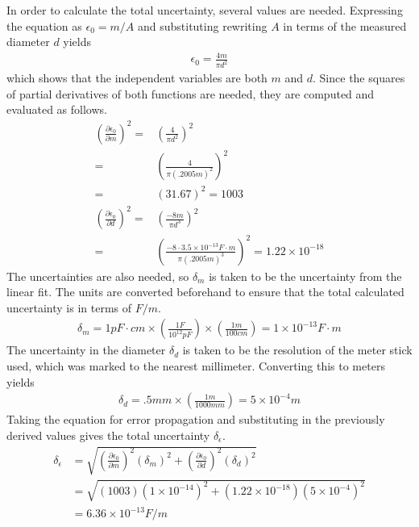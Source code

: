 \documentclass[twocolumn,english]{IEEEtran}
\theoremstyle{plain}
\theoremstyle{plain}
\begin{document}
  In order to calculate the total uncertainty, several values are needed. Expressing the equation as $\epsilon_0 = m/A$ and substituting rewriting $A$ in terms of the measured diameter $d$ yields
  \begin{align*}
   \epsilon_0= \frac{4m}{\pi d^2}
  \end{align*}
  which shows that the independent variables are both $m$ and $d$. Since the squares of partial derivatives of both functions are needed, they are computed and evaluated as follows.
  \begin{align*}
   \left(\frac{\partial \epsilon_0}{\partial m}\right)^2 =& \left(\frac{4}{\pi d^2}\right)^2 \\
   =& \left(\frac{4}{\pi (.2005 m)^2}\right)^2 \\
   =& (31.67)^2 =1003 \\
   \left(\frac{\partial \epsilon_0}{\partial d}\right)^2 =& \left(\frac{-8m}{\pi d^3}\right)^2 \\
   =& \left(\frac{-8\cdot 3.5\times 10^{-13} F\cdot m}{\pi (.2005 m)^3}\right)^2
   = 1.22 \times 10^{-18}
  \end{align*}
  The uncertainties are also needed, so $\delta_m$ is taken to be the uncertainty from the linear fit. The units are converted beforehand to ensure that the total calculated uncertainty is in terms of $F/m$.
  \begin{align*}
   \delta_m = 1 pF\cdot cm \times (\frac{1 F}{10^{12} pF}) \times (\frac{1 m}{100 cm}) = 1 \times 10^{-13} F\cdot m
  \end{align*}
  The uncertainty in the diameter $\delta_d$ is taken to be the resolution of the meter stick used, which was marked to the nearest millimeter. Converting this to meters yields
  \begin{align*}
   \delta_d = .5 mm \times (\frac{1 m}{1000 mm}) = 5\times 10^{-4} m
  \end{align*}
  Taking the equation for error propagation and substituting in the previously derived values gives the total uncertainty $\delta_{\epsilon}$.
  \begin{align*}
   \delta_{\epsilon} &= \sqrt{(\frac{\partial \epsilon_0}{\partial m})^2(\delta_m)^2 + (\frac{\partial \epsilon_0}{\partial d})^2(\delta_d)^2} \\
   &= \sqrt{(1003)(1\times 10^{-14})^2 + (1.22 \times 10^{-18})(5\times 10^{-4})^2} \\
   &= 6.36 \times 10^{-13} F/m
  \end{align*}
\end{document}
